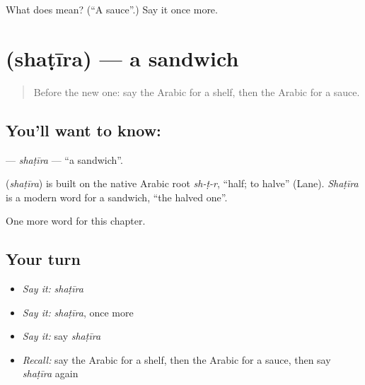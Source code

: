 \begin{tcolorbox}[breakable,colback=teal!4,colframe=teal!35!black,title={Before you move on}]
What does  mean? (\textquotedblleft{}A sauce\textquotedblright{}.) Say it once more.
\end{tcolorbox}
\section[\texorpdfstring{\ar{شطيرة} (shaṭīra)}{شطيرة (shaṭīra)}]{ (shaṭīra) — a sandwich}

\label{lesson:AR-C182-shatira}



\begin{quote}
Before the new one: say the Arabic for a shelf, then the Arabic for a sauce.
\end{quote}

\subsection*{You'll want to know: }
\textbf{} — \emph{shaṭīra} — \textquotedblleft{}a sandwich\textquotedblright{}.

\begin{cousinweb}
\textbf{} (\emph{shaṭīra}) is built on the native Arabic root \emph{sh-ṭ-r}, \textquotedblleft{}half; to halve\textquotedblright{} (Lane). \emph{Shaṭīra} is a modern word for a sandwich, \textquotedblleft{}the halved one\textquotedblright{}.
\end{cousinweb}

\begin{grammarlens}[title={What you've built}]
One more word for this chapter.
\end{grammarlens}

\subsection*{Your turn}
\begin{itemize}
\raggedright
  \item \emph{Say it:} \emph{shaṭīra}
  \item \emph{Say it:} \emph{shaṭīra}, once more
  \item \emph{Say it:} say \emph{shaṭīra}
  \item \emph{Recall:} say the Arabic for a shelf, then the Arabic for a sauce, then say \emph{shaṭīra} again
\end{itemize}

